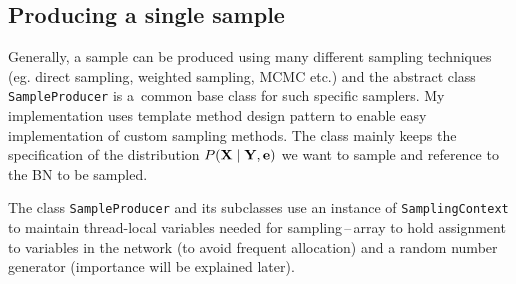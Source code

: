 \documentclass[english,cover]{fitthesis} %
\newcommand{\srccode}[1]{{\tt #1}}         %
\newcommand{\vars}[1]{{\bold{#1}}}         %
\begin{document}
\subsection{Producing a single sample}
Generally, a sample can be produced using many different sampling techniques (eg. direct sampling, weighted sampling, MCMC etc.) and the abstract class \srccode{SampleProducer} is a~common base class for such specific samplers. My implementation uses template method design pattern to enable easy implementation of custom sampling methods. The class mainly keeps the specification of the distribution $P(\vars{X} \mid \vars{Y}, \vars{e})$ we want to sample and reference to the BN to be sampled.

The class \srccode{SampleProducer} and its subclasses use an instance of \srccode{SamplingContext} to maintain thread-local variables needed for sampling\,--\,array to hold assignment to variables in the network (to avoid frequent allocation) and a random number generator (importance will be explained later).
\end{document}
